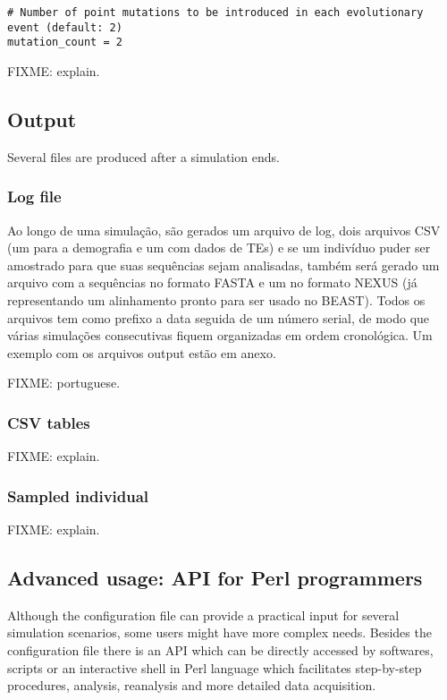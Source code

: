 \documentclass[10pt]{article}
\begin{document}
\begin{verbatim}
# Number of point mutations to be introduced in each evolutionary event (default: 2)
mutation_count = 2
\end{verbatim}

FIXME: explain.

\subsection{Output}
\label{sec:output}

Several files are produced after a simulation ends.

\subsubsection{Log file}
\label{sec:output_log}

Ao longo de uma simulação, são gerados um arquivo de log, dois
arquivos CSV (um para a demografia e um com dados de TEs) e se um
indivíduo puder ser amostrado para que suas sequências sejam
analisadas, também será gerado um arquivo com a sequências no formato
FASTA e um no formato NEXUS (já representando um alinhamento pronto
para ser usado no BEAST). Todos os arquivos tem como prefixo a data
seguida de um número serial, de modo que várias simulações
consecutivas fiquem organizadas em ordem cronológica. Um exemplo com
os arquivos output estão em anexo.

FIXME: portuguese.

\subsubsection{CSV tables}
\label{sec:output_csv}

FIXME: explain.

\subsubsection{Sampled individual}
\label{sec:output_sample}

FIXME: explain.

\subsection{Advanced usage: API for Perl programmers}

Although the configuration file can provide a practical input for
several simulation scenarios, some users might have more complex
needs. Besides the configuration file there is an API which can be
directly accessed by softwares, scripts or an interactive shell in
Perl language which facilitates step-by-step procedures, analysis,
reanalysis and more detailed data acquisition.
\end{document}

